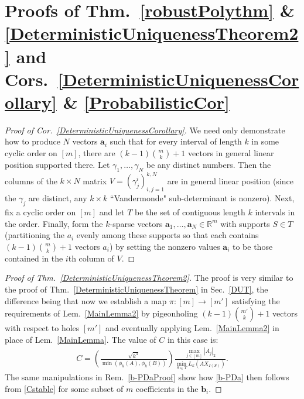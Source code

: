 \documentclass[journal, twocolumn]{IEEEtran}
\newtheorem{remark}{Remark}
\begin{document}

\section{Proofs of Thm.~\ref{robustPolythm} \& \ref{DeterministicUniquenessTheorem2} and Cors.~\ref{DeterministicUniquenessCorollary} \& \ref{ProbabilisticCor}}

\begin{proof}[Proof of Cor.~\ref{DeterministicUniquenessCorollary}]
We need only demonstrate how to produce $N$ vectors $\mathbf{a}_i$ such that for every interval of length $k$ in some cyclic order on $[m]$, there are  \mbox{$(k-1){m \choose k}+1$} vectors in general linear position supported there. Let $\gamma_1, \ldots, \gamma_N$ be any distinct numbers. Then the columns of the $k \times N$ matrix $V = (\gamma^i_j)^{k,N}_{i,j=1}$ are in general linear position (since the $\gamma_j$ are distinct, any $k \times k$ ``Vandermonde" sub-determinant is nonzero). Next, fix a cyclic order on $[m]$ and let $T$ be the set of contiguous length $k$ intervals in the order. Finally, form the $k$-sparse vectors $\mathbf{a}_1, \ldots, \mathbf{a}_N \in \mathbb{R}^m$ with supports $S \in T$ (partitioning the $a_i$ evenly among these supports so that each contains $(k-1){m \choose k}+1$ vectors $a_i$) by setting the nonzero values $\mathbf{a}_i$ to be those contained in the $i$th column of $V$.
\end{proof}

\begin{proof}[Proof of Thm.~\ref{DeterministicUniquenessTheorem2}]
The proof is very similar to the proof of Thm.~\ref{DeterministicUniquenessTheorem} in Sec.~\ref{DUT}, the difference being that now we establish a map $\pi: [m] \to [m']$ satisfying the requirements of Lem.~\ref{MainLemma2} by pigeonholing $(k-1){m' \choose k} + 1$ vectors with respect to holes $[m']$ and eventually applying Lem.~\ref{MainLemma2} in place of Lem.~\ref{MainLemma}. The value of $C$ in this case is:
\begin{align}\label{Cdef2}
C= \left( \frac{ \sqrt{k^3}}{ \min(\phi_k(A), \phi_k(B)) } \right) \frac{\max_{j \in [m]} |A_j|_2}{\min_{S \in T} L_k(AX_{I(S)})}.
\end{align}
The same manipulations in Rem.~\ref{b-PDaProof} show how \eqref{b-PDa} then follows from \eqref{Cstable} for some subset of $m$ coefficients in the $\mathbf{b}_i$. 

\end{proof}
\end{document}
